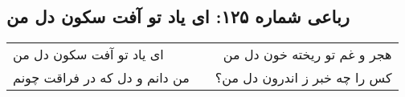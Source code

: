 \begin{center}
\section*{رباعی شماره ۱۲۵: ای یاد تو آفت سکون دل من}
\label{sec:125}
\begin{longtable}{l p{0.5cm} r}
ای یاد تو آفت سکون دل من
&&
هجر و غم تو ریخته خون دل من
\\
من دانم و دل که در فراقت چونم
&&
کس را چه خبر ز اندرون دل من؟
\\
\end{longtable}
\end{center}
